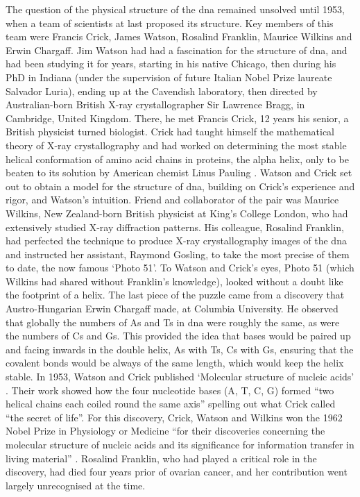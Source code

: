 The question of the physical structure of the \gls{dna} remained unsolved until 1953, when a team of scientists at last proposed its structure. 
Key members of this team were Francis Crick, James Watson, Rosalind Franklin, Maurice Wilkins and Erwin Chargaff. 
Jim Watson had had a fascination for the structure of \gls{dna}, and had been studying it for years, starting in his native Chicago, then during his PhD in Indiana (under the supervision of future Italian Nobel Prize laureate Salvador Luria), ending up at the Cavendish laboratory, then directed by Australian-born British X-ray crystallographer Sir Lawrence Bragg, in Cambridge, United Kingdom. 
There, he met Francis Crick, 12 years his senior, a British physicist turned biologist. 
Crick had taught himself the mathematical theory of X-ray crystallography and had worked on determining the most stable helical conformation of amino acid chains in proteins, the alpha helix, only to be beaten to its solution by American chemist Linus Pauling \cite{pauling1951structure}. 
Watson and Crick set out to obtain a model for the structure of \gls{dna}, building on Crick’s experience and rigor, and Watson’s intuition. 
Friend and collaborator of the pair was Maurice Wilkins, New Zealand-born British physicist at King’s College London, who had extensively studied X-ray diffraction patterns. 
His colleague, Rosalind Franklin, had perfected the technique to produce X-ray crystallography images of the \gls{dna} and instructed her assistant, Raymond Gosling, to take the most precise of them to date, the now famous `Photo 51'. 
To Watson and Crick’s eyes, Photo 51 (which Wilkins had shared without Franklin's knowledge), looked without a doubt like the footprint of a helix. 
The last piece of the puzzle came from a discovery that Austro-Hungarian Erwin Chargaff made, at Columbia University. 
He observed that globally the numbers of As and Ts in \gls{dna} were roughly the same, as were the numbers of Cs and Gs. 
This provided the idea that bases would be paired up and facing inwards in the double helix, As with Ts, Cs with Gs, ensuring that the covalent bonds would be always of the same length, which would keep the helix stable. 
In 1953, Watson and Crick published `Molecular structure of nucleic acids' \cite{watson1953molecular}. 
Their work showed how the four nucleotide bases (A, T, C, G) formed “two helical chains each coiled round the same axis” \cite{watson1953molecular} spelling out what Crick called “the secret of life”. 
For this discovery, Crick, Watson and Wilkins won the 1962 Nobel Prize in Physiology or Medicine “for their discoveries concerning the molecular structure of nucleic acids and its significance for information transfer in living material” \cite{nobel1962nobel}. 
Rosalind Franklin, who had played a critical role in the discovery, had died four years prior of ovarian cancer, and her contribution went largely unrecognised at the time.

